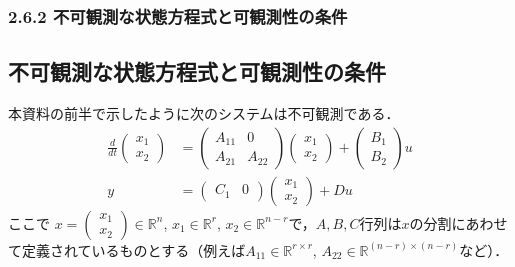 \begin{frame}[t]
\frametitle{2.6.2 不可観測な状態方程式と可観測性の条件}

\subsection{不可観測な状態方程式と可観測性の条件}

本資料の前半で示したように次のシステムは不可観測である．
\begin{align}
 \frac{d}{dt}
  \left(\begin{array}{c}
         {x}_1 \\
	 {x}_2 
	\end{array}\right)
  &=
  \left(\begin{array}{cc}
         {A}_{11} & 0 \\
	     {A}_{21} & {A}_{22}
	\end{array}\right)
  \left(\begin{array}{c}
         {x}_1 \\
	 {x}_2 
	\end{array}\right)
  +
  \left(\begin{array}{c}
         {B}_1 \\
	 {B}_2
	\end{array}\right)
  u 
\label{eq:unobservable1D} \\
 y &=
  \left(\begin{array}{cc}
         {C}_1 & 0
	\end{array}\right)
  \left(\begin{array}{c}
         {x}_1 \\
	 {x}_2 
	\end{array}\right)
  + D u
\label{eq:unobservable2D}
\end{align}
ここで
$x = \left(\begin{array}{c} {x}_1 \\ {x}_2 \end{array}\right) \in {\mathbb R}^n$, 
$x_1 \in {\mathbb R}^r$, $x_2 \in {\mathbb R}^{n-r}$で，$A,B,C$行列は$x$の分割にあわせて定義されているものとする（例えば$A_{11} \in {\mathbb R}^{r \times r}$, $A_{22} \in {\mathbb R}^{(n-r) \times (n-r)}$など）．

\end{frame}

